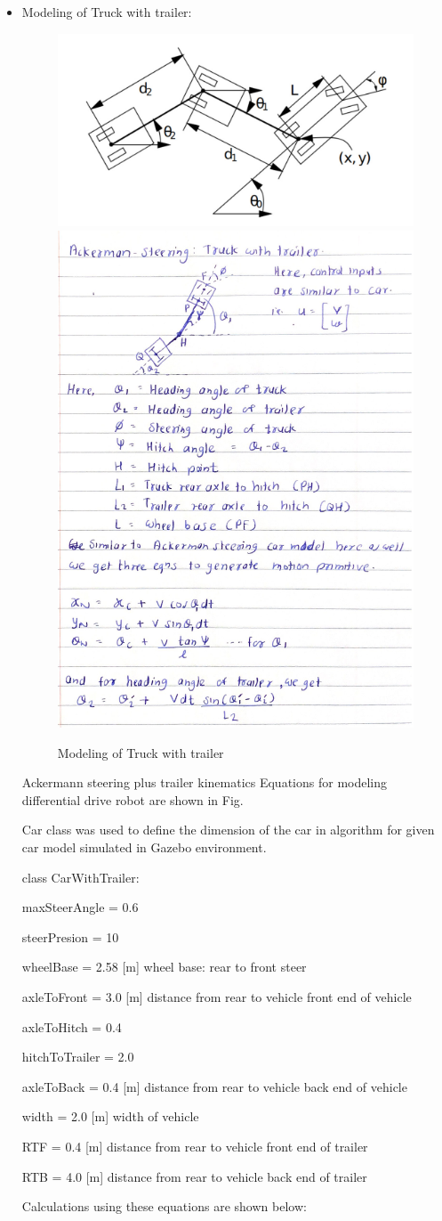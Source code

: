 \documentclass[12pt,a4paper]{article}
\begin{document}
\begin{itemize}
        
    \item Modeling of Truck with trailer: \par 
        \begin{figure}[htbp!]
        \begin{center}
        \includegraphics[width=0.4\columnwidth]{images/model_trailer.jpeg}
        \includegraphics[width=0.4\columnwidth]{algorithm/truck_model.png}
        \end{center}
        \caption{Modeling of Truck with trailer}
        \label{fig:Occupancy_grid}
        \end{figure}
        Ackermann steering plus trailer kinematics Equations for modeling differential drive robot are shown in Fig.\par
        Car class was used to define the dimension of the car in algorithm for given car model simulated in Gazebo environment.
        \par
        class CarWithTrailer:\par
            maxSteerAngle = 0.6\par
            steerPresion = 10\par
            wheelBase = 2.58    [m] wheel base: rear to front steer\par
            axleToFront = 3.0   [m] distance from rear to vehicle front end of vehicle\par
            axleToHitch = 0.4   \par
            hitchToTrailer = 2.0\par
            axleToBack = 0.4     [m] distance from rear to vehicle back end of vehicle\par
            width = 2.0    [m] width of vehicle\par
            RTF = 0.4   [m] distance from rear to vehicle front end of trailer\par
            RTB = 4.0   [m] distance from rear to vehicle back end of trailer\par
        Calculations using these equations are shown below:\par

\end{itemize}
\end{document}

